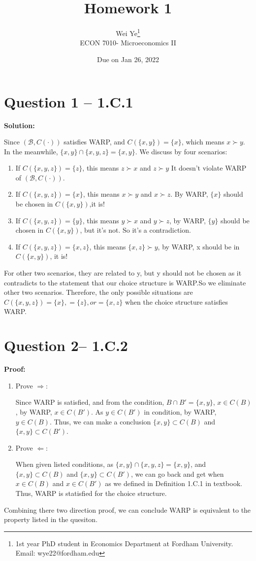 \documentclass[11pt]{article} %
\title{Homework 1}
\author{Wei Ye\footnote{ 1st year PhD student in Economics Department at Fordham University. Email: wye22@fordham.edu}
    \\ ECON 7010- Microeconomics II}
\date{Due on Jan 26, 2022}
\begin{document}
\maketitle

\section{Question 1 -- 1.C.1}
\textbf{Solution:}

Since $(\mathscr{B},C(\cdot))$ satisfies WARP, and $C(\{x,y\})=\{x\}$, which means $x\succ y$. In the meanwhile,
$\{x,y\}\cap\{x,y,z\}=\{x,y\}$.
We discuss by four scenarios:
\begin{enumerate}[1)]
    \item If $C(\{x,y,z\})=\{z\}$, this means $z\succ x$ and $z\succ y$ It doesn't violate WARP of $(\mathscr{B},C(\cdot))$.
    \item If $C(\{x,y,z\})=\{x\}$, this means $x\succ y$ and $x\succ z$. By WARP, $\{x\}$ should be chosen in $C(\{x,y\})$,it is! 
    \item If $C(\{x,y,z\})=\{y\}$, this means $y\succ x$ and $y\succ z$, by WARP, $\{y\}$ should be chosen in $C(\{x,y\})$, but it's not. So it's a contradiction.
    \item If $C(\{x,y,z\})=\{x,z\}$, this means $\{x,z\}\succ y$, by WARP, x should be in $C(\{x,y\})$, it is!
\end{enumerate} 
For other two scenarios, they are related to y, but y should not be chosen as it contradicts to the statement that our choice structure is WARP.So we eliminate other  two scenarios.
Therefore, the only possible situations are $C(\{x,y,z\})=\{x\},=\{z\}, or =\{x,z\}$ when the choice structure satisfies WARP.\smiley


\section{Question 2-- 1.C.2}
\textbf{Proof:}
\begin{enumerate}[1):]
    \item Prove $\Rightarrow$:
    
        Since WARP is satisfied, and from the condition, $B\cap B'=\{x,y\}$, $x\in C(B)$, by WARP, $x\in C(B')$. As $y\in C(B')$ in condition, by WARP, $y\in C(B)$. Thus, we can make a conclusion $\{x,y\}\subset C(B)$ and $\{x,y\}\subset C(B')$.
    \item Prove $\Leftarrow$:

    When given listed conditions, as $\{x,y\}\cap\{x,y,z\}=\{x,y\}$, and $\{x,y\}\subset C(B)$ and $\{x,y\}\subset C(B')$, we can go back and get when $x\in C(B)$ and  $x\in C(B')$ as we defined in Definition 1.C.1 in textbook. Thus, WARP is statisfied for the choice structure.
\end{enumerate}
Combining there two direction proof, we can conclude WARP is equivalent to the property listed in the quesiton.\smiley
\end{document}
